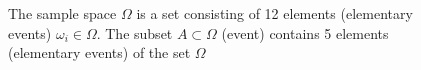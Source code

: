 \begin{figure}
\centering



\caption{The sample space $\Omega$ is a set consisting of 12 elements (elementary events) 
$\omega_i \in \Omega$. The subset $A \subset \Omega$ (event) contains 5 elements (elementary events) of the set $\Omega$}
\label{figAddProbabilityDefinition}
\end{figure}